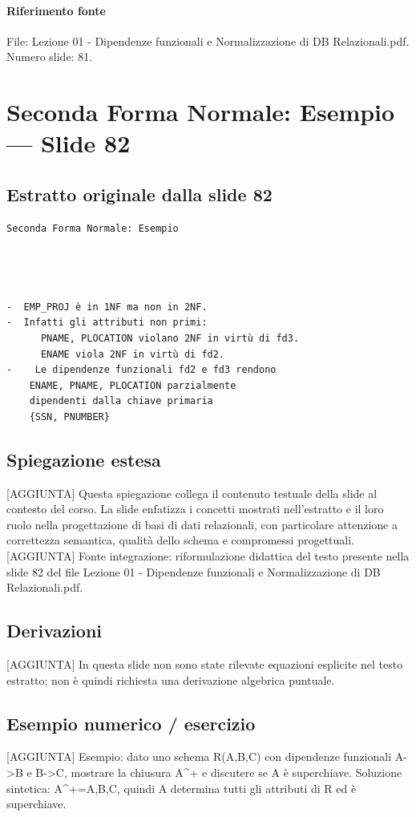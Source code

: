 \documentclass[11pt]{article}
\begin{document}
\paragraph{Riferimento fonte} File: Lezione 01 - Dipendenze funzionali e Normalizzazione di DB Relazionali.pdf. Numero slide: 81.
\section{Seconda Forma Normale: Esempio --- Slide 82}
\subsection*{Estratto originale dalla slide 82}
\begin{lstlisting}
Seconda Forma Normale: Esempio




-  EMP_PROJ è in 1NF ma non in 2NF.
-  Infatti gli attributi non primi:
      PNAME, PLOCATION violano 2NF in virtù di fd3.
      ENAME viola 2NF in virtù di fd2.
-    Le dipendenze funzionali fd2 e fd3 rendono
    ENAME, PNAME, PLOCATION parzialmente
    dipendenti dalla chiave primaria
    {SSN, PNUMBER}
\end{lstlisting}
\subsection*{Spiegazione estesa}
[AGGIUNTA] Questa spiegazione collega il contenuto testuale della slide al contesto del corso. La slide enfatizza i concetti mostrati nell'estratto e il loro ruolo nella progettazione di basi di dati relazionali, con particolare attenzione a correttezza semantica, qualità dello schema e compromessi progettuali.
[AGGIUNTA] Fonte integrazione: riformulazione didattica del testo presente nella slide 82 del file Lezione 01 - Dipendenze funzionali e Normalizzazione di DB Relazionali.pdf.
\subsection*{Derivazioni}
[AGGIUNTA] In questa slide non sono state rilevate equazioni esplicite nel testo estratto; non è quindi richiesta una derivazione algebrica puntuale.
\subsection*{Esempio numerico / esercizio}
[AGGIUNTA] Esempio: dato uno schema R(A,B,C) con dipendenze funzionali A->B e B->C, mostrare la chiusura A^+ e discutere se A è superchiave. Soluzione sintetica: A^+={A,B,C}, quindi A determina tutti gli attributi di R ed è superchiave.
\end{document}
